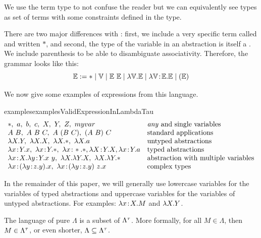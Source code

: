We use the term type to not confuse the reader but we can equivalently see types as set of terms with some constraints defined in the type.

There are two major differences with \simplyTypedLambdaCalc: first, we include a very specific term called  and written $*$, and second, the type of the variable in an abstraction is itself a \lambdaterm.
We include parenthesis to be able to disambiguate associativity. Therefore, the grammar looks like this:
\[
\mathbb{E} := * \mid \mathbb{V} \mid \mathbb{E}\ \mathbb{E} \mid \lambda \mathbb{V}.\mathbb{E} \mid \lambda \mathbb{V}\nobreak\mskip2mu{:}\mskip2mu\nobreak\mathbb{E}.\mathbb{E} \mid (\mathbb{E})
\]

We now give some examples of expressions from this language.
{
    \newcommand{\sep}{,\ }

    \begin{reusable}{examples}{examplesValidExpressionInLambdaTau}
    \[
    \begin{array}{ll}
        * \sep a \sep b \sep c \sep X \sep Y \sep Z \sep myvar & \text{\textit{any} and single variables} \\
        \app A B \sep \app A \app B C \sep \app A {(\app B C)} \sep \app {(\app A B)} C & \text{standard applications} \\
        \uabs X.Y \sep \uabs X.X \sep \lambda X.* \sep \lambda X.a & \text{untyped abstractions} \\
        \tabs x:Y.x \sep \tabs x:Y.* \sep \tabs x:*.*, \tabs X:Y.X, \tabs x:Y.a & \text{typed abstractions} \\
        \tabs x:X.\tabs y:Y.\app x y \sep \uabs X.\uabs Y.X \sep \uabs X.\uabs Y.* & \text{abstraction with multiple variables} \\
        \tabs x:(\tabs y:z.y).x \sep \tabs x:\app {(\tabs y:z.y)} z.x & \text{complex types} \\
    \end{array}
    \]
    \end{reusable}
}

In the remainder of this paper, we will generally use lowercase variables for the variables of typed abstractions and uppercase variables for the variables of untyped abstractions. For examples: $\tabs x:X.M$ and $\lambda X.Y$.

\begin{lemma}
    The language of pure \lambdacalc $\Lambda$ is a subset of $\Lambda^{\tau}$. More formally, for all $M \in \Lambda$, then $M \in \Lambda^{\tau}$, or even shorter, $\Lambda \subseteq \Lambda^{\tau}$.
\end{lemma}

